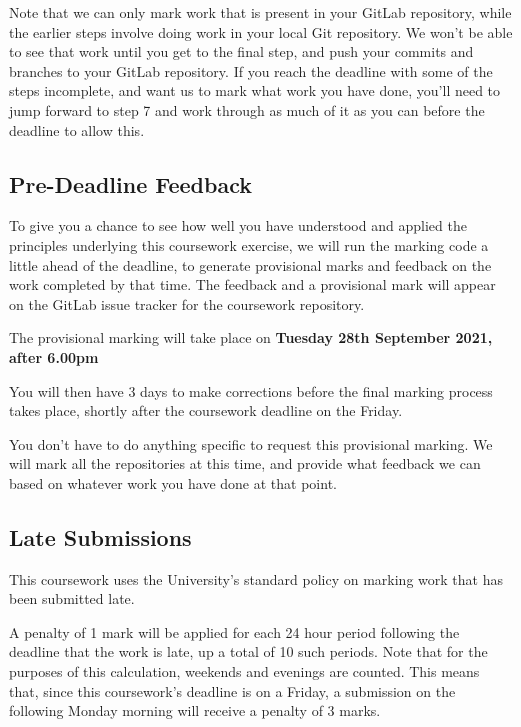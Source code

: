 \documentclass[
]{book}
\begin{document}
Note that we can only mark work that is present in your GitLab repository, while the earlier steps involve doing work in your local Git repository. We won't be able to see that work until you get to the final step, and push your commits and branches to your GitLab repository. If you reach the deadline with some of the steps incomplete, and want us to mark what work you have done, you'll need to jump forward to step 7 and work through as much of it as you can before the deadline to allow this.

\hypertarget{prov}{%
\subsection{Pre-Deadline Feedback}\label{prov}}

To give you a chance to see how well you have understood and applied the principles underlying this coursework exercise, we will run the marking code a little ahead of the deadline, to generate provisional marks and feedback on the work completed by that time. The feedback and a provisional mark will appear on the GitLab issue tracker for the coursework repository.

The provisional marking will take place on \textbf{Tuesday 28th September 2021, after 6.00pm}

You will then have 3 days to make corrections before the final marking process takes place, shortly after the coursework deadline on the Friday.

You don't have to do anything specific to request this provisional marking. We will mark all the repositories at this time, and provide what feedback we can based on whatever work you have done at that point.

\hypertarget{late}{%
\subsection{Late Submissions}\label{late}}

This coursework uses the University's standard policy on marking work that has been submitted late.

A penalty of 1 mark will be applied for each 24 hour period following the deadline that the work is late, up a total of 10 such periods. Note that for the purposes of this calculation, weekends and evenings are counted. This means that, since this coursework's deadline is on a Friday, a submission on the following Monday morning will receive a penalty of 3 marks.
\end{document}
